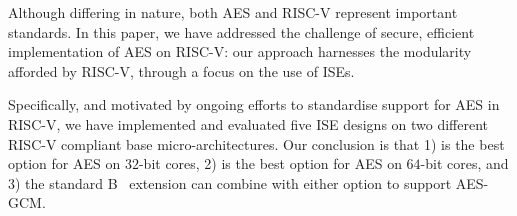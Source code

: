 
Although differing in nature, both AES and RISC-V represent important
standards.  In this paper, we have addressed the challenge of secure, 
efficient implementation of AES on RISC-V: our approach harnesses the
modularity afforded by RISC-V, through a focus on the use of ISEs.

Specifically, and motivated by ongoing efforts to standardise support 
for AES in RISC-V, we have implemented and evaluated five ISE designs 
on two different RISC-V compliant base micro-architectures.
Our conclusion is that
1) 
   is the best option for 
   AES on $32$-bit cores,
2) 
   is the best option for 
   AES on $64$-bit cores,
   and
3) the
   standard 
   B~\cite[Section 17]{RV:ISA:I:19}
   extension
   can combine with either option to support AES-GCM.

%


